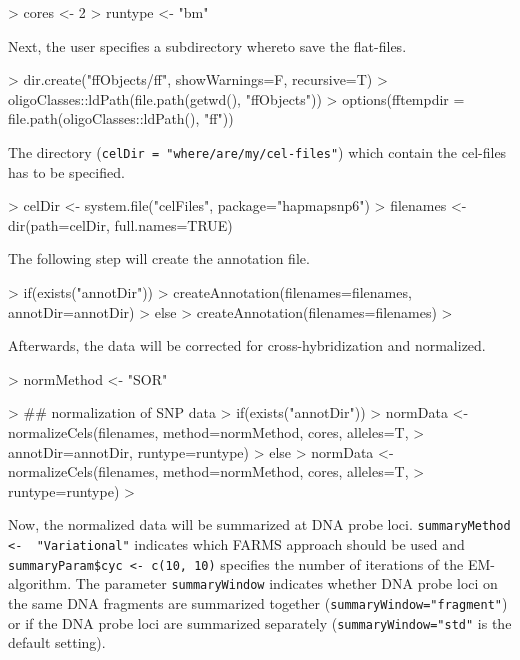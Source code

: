 \documentclass[article]{bioinf}
\begin{document}
\begin{Sinput}
> cores <- 2
> runtype <- "bm"
\end{Sinput}

\noindent  Next, the user specifies a subdirectory whereto save the flat-files.

\begin{Sinput}
> dir.create("ffObjects/ff", showWarnings=F, recursive=T)
> oligoClasses::ldPath(file.path(getwd(), "ffObjects"))
> options(fftempdir = file.path(oligoClasses::ldPath(), "ff"))
\end{Sinput}

\noindent  The directory (\verb+celDir = "where/are/my/cel-files"+) which contain the cel-files has to be specified. 

\begin{Sinput}
> celDir <- system.file("celFiles", package="hapmapsnp6")
> filenames <- dir(path=celDir, full.names=TRUE)
\end{Sinput}

\noindent The following step will create the annotation file.

\begin{Sinput}
> if(exists("annotDir")) {
>	createAnnotation(filenames=filenames, annotDir=annotDir)	
> } else {
> 	createAnnotation(filenames=filenames)
> }
\end{Sinput}

\noindent Afterwards, the data will be corrected for cross-hybridization and normalized.

\begin{Sinput}
> normMethod <- "SOR"

> ## normalization of SNP data
> if(exists("annotDir")) {
> 	normData <- normalizeCels(filenames, method=normMethod, cores, alleles=T, 
> 			annotDir=annotDir, runtype=runtype)
> } else {
> 	normData <- normalizeCels(filenames, method=normMethod, cores, alleles=T, 
> 			runtype=runtype)
> }
\end{Sinput}

\noindent Now, the normalized data will be summarized at DNA probe loci. \verb+summaryMethod <-  "Variational"+ indicates which FARMS
approach should be used and \verb+summaryParam$cyc <- c(10, 10)+ specifies the number of iterations of the EM-algorithm. The parameter 
\verb+summaryWindow+ indicates whether DNA probe loci on the same DNA fragments are summarized together (\verb+summaryWindow="fragment"+) 
or if the DNA probe loci are summarized separately (\verb+summaryWindow="std"+ is the default setting).
\end{document}
